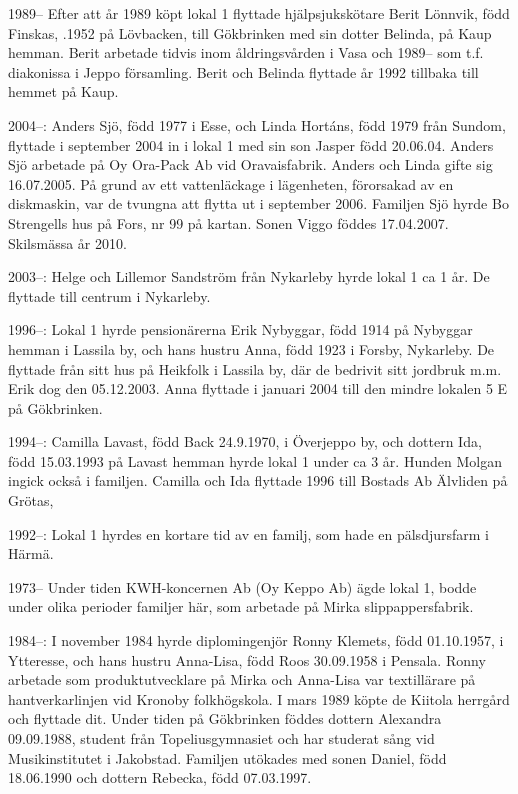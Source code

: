  1989--
Efter att år 1989 köpt lokal 1 flyttade hjälpsjukskötare Berit Lönnvik, född Finskas, .1952 på Lövbacken, till Gökbrinken med sin dotter Belinda,  på Kaup hemman. Berit arbetade tidvis inom  åldringsvården i Vasa och 1989-- som t.f. diakonissa i Jeppo församling. Berit och Belinda flyttade år 1992 tillbaka till hemmet på Kaup.

2004--: Anders Sjö, född 1977 i Esse, och Linda Hortáns, född 1979 från Sundom, flyttade i september 2004 in i lokal 1 med sin son Jasper född 20.06.04. Anders Sjö arbetade på Oy Ora-Pack Ab vid Oravaisfabrik. Anders och Linda	gifte sig 16.07.2005. På grund av ett vattenläckage i lägenheten, förorsakad av en diskmaskin, var de tvungna	att flytta ut i september 2006. Familjen Sjö hyrde Bo	Strengells hus på Fors, nr 99 på kartan. Sonen Viggo föddes 17.04.2007. Skilsmässa år 2010.

2003--: Helge och Lillemor Sandström från Nykarleby hyrde lokal 1 ca 1 år. De flyttade till centrum i Nykarleby.

1996--: Lokal 1 hyrde pensionärerna Erik Nybyggar, född 1914 på Nybyggar hemman i Lassila by, och hans hustru Anna, född 1923 i Forsby, Nykarleby. De flyttade från sitt hus på Heikfolk i Lassila by, där de bedrivit sitt jordbruk m.m.  Erik dog den 05.12.2003. Anna flyttade i januari 2004 till den mindre lokalen 5 E på Gökbrinken.

1994--: Camilla Lavast, född Back 24.9.1970, i Överjeppo by, och dottern Ida, född 15.03.1993 på Lavast hemman hyrde lokal 1 under ca 3 år. Hunden Molgan ingick också i familjen. Camilla och Ida flyttade 1996 till Bostads Ab Älvliden på Grötas,

1992--: Lokal 1 hyrdes en kortare tid av en familj, som hade en pälsdjursfarm i Härmä.


 1973--
Under tiden KWH-koncernen Ab (Oy Keppo Ab) ägde lokal 1, bodde under olika perioder familjer här, som arbetade på Mirka slippappersfabrik.

1984--: I november 1984 hyrde diplomingenjör Ronny Klemets, född 01.10.1957, i Ytteresse, och hans hustru Anna-Lisa, född Roos 30.09.1958 i Pensala. Ronny arbetade som produktutvecklare på Mirka och Anna-Lisa var textillärare på hantverkarlinjen vid Kronoby folkhögskola. I mars 1989 köpte de Kiitola herrgård och flyttade dit. Under tiden på Gökbrinken föddes dottern Alexandra 09.09.1988, student från Topeliusgymnasiet och har studerat sång vid Musikinstitutet i Jakobstad. Familjen utökades med sonen Daniel, född 18.06.1990 och dottern Rebecka, född  07.03.1997.

